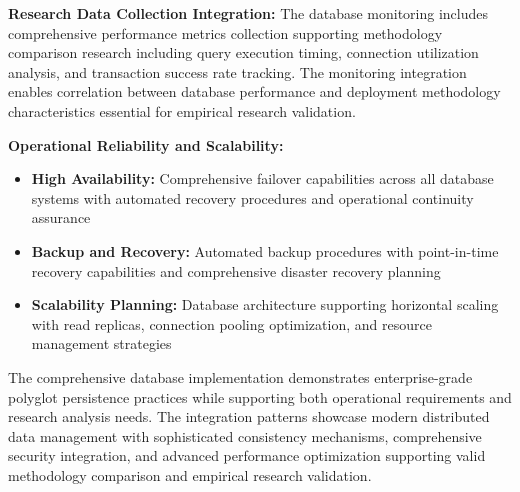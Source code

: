 \textbf{Research Data Collection Integration:}
The database monitoring includes comprehensive performance metrics collection supporting methodology comparison research including query execution timing, connection utilization analysis, and transaction success rate tracking. The monitoring integration enables correlation between database performance and deployment methodology characteristics essential for empirical research validation.

\textbf{Operational Reliability and Scalability:}
\begin{itemize}
\item \textbf{High Availability:} Comprehensive failover capabilities across all database systems with automated recovery procedures and operational continuity assurance
\item \textbf{Backup and Recovery:} Automated backup procedures with point-in-time recovery capabilities and comprehensive disaster recovery planning
\item \textbf{Scalability Planning:} Database architecture supporting horizontal scaling with read replicas, connection pooling optimization, and resource management strategies
\end{itemize}

The comprehensive database implementation demonstrates enterprise-grade polyglot persistence practices while supporting both operational requirements and research analysis needs. The integration patterns showcase modern distributed data management with sophisticated consistency mechanisms, comprehensive security integration, and advanced performance optimization supporting valid methodology comparison and empirical research validation.